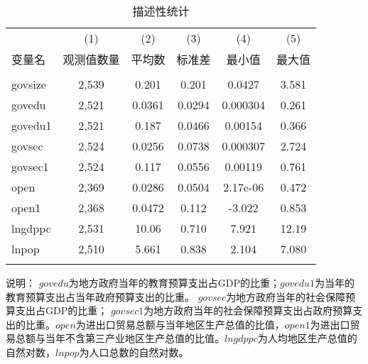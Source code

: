 \documentclass[10pt]{article}
\begin{document}
    \begin{table}
        \begin{center}
            \caption{描述性统计}
            \label{tb:des}
            \begin{threeparttable}
            \begin{tabular}{lccccc} \hline \hline
                 & (1) & (2) & (3) & (4) & (5) \\
                变量名 & 观测值数量 & 平均数 & 标准差 & 最小值 & 最大值 \\ \hline
                 &  &  &  &  &  \\
                govsize & 2,539 & 0.201 & 0.201 & 0.0427 & 3.581 \\
                govedu & 2,521 & 0.0361 & 0.0294 & 0.000304 & 0.261 \\
                govedu1 & 2,521 & 0.187 & 0.0466 & 0.00154 & 0.366 \\
                govsec & 2,524 & 0.0256 & 0.0738 & 0.000307 & 2.724 \\
                govsec1 & 2,524 & 0.117 & 0.0556 & 0.00119 & 0.761 \\
                open & 2,369 & 0.0286 & 0.0504 & 2.17e-06 & 0.472 \\
                open1 & 2,368 & 0.0472 & 0.112 & -3.022 & 0.853 \\
                lngdppc & 2,531 & 10.06 & 0.710 & 7.921 & 12.19 \\
                lnpop & 2,510 & 5.661 & 0.838 & 2.104 & 7.080 \\
                 &  &  &  &  &  \\ \hline \hline
            \end{tabular}

            \begin{tablenotes}
                \item 说明：
                $govedu$为地方政府当年的教育预算支出占GDP的比重；$govedu1$为当年的教育预算支出占当年政府预算支出的比重。
                 $govsec$为地方政府当年的社会保障预算支出占GDP的比重； $govsec1$为地方政府当年的社会保障预算支出占政府预算支出的比重。$open$为进出口贸易总额与当年地区生产总值的比值，$open1$为进出口贸易总额与当年不含第三产业地区生产总值的比值。$lngdppc$为人均地区生产总值的自然对数，$lnpop$为人口总数的自然对数。
            \end{tablenotes}
            \end{threeparttable}
        \end{center}
    \end{table}
\end{document}
